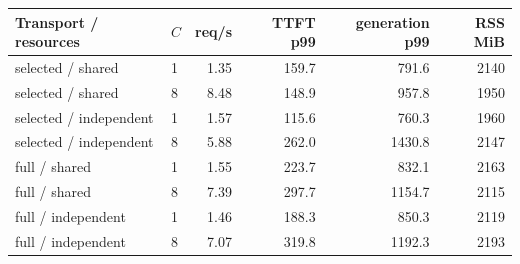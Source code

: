 \begin{tabular}{llrrrr}\toprule
Transport / resources & $C$ & req/s & TTFT p99 & generation p99 & RSS MiB\\\midrule
selected / shared & 1 & 1.35 & 159.7 & 791.6 & 2140 \\
selected / shared & 8 & 8.48 & 148.9 & 957.8 & 1950 \\
selected / independent & 1 & 1.57 & 115.6 & 760.3 & 1960 \\
selected / independent & 8 & 5.88 & 262.0 & 1430.8 & 2147 \\
full / shared & 1 & 1.55 & 223.7 & 832.1 & 2163 \\
full / shared & 8 & 7.39 & 297.7 & 1154.7 & 2115 \\
full / independent & 1 & 1.46 & 188.3 & 850.3 & 2119 \\
full / independent & 8 & 7.07 & 319.8 & 1192.3 & 2193 \\
\bottomrule\end{tabular}

